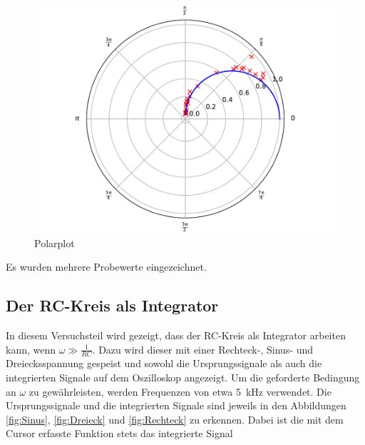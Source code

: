 \begin{figure}
  \centering
  \includegraphics[scale=0.8]{content/plot4.pdf}
  \caption{Polarplot}
  \label{fig:plot4}
\end{figure}

Es wurden mehrere Probewerte eingezeichnet.

\subsection{Der RC-Kreis als Integrator}

In diesem Versuchsteil wird gezeigt, dass der RC-Kreis als Integrator arbeiten 
kann, wenn $\omega \gg \frac{1}{RC}$. Dazu wird dieser mit einer Rechteck-, 
Sinus- und Dreiecksspannung gespeist und sowohl die Ursprungssignale als auch 
die integrierten Signale auf dem Oszilloskop angezeigt. Um die geforderte 
Bedingung an $\omega$ zu gewährleisten, werden Frequenzen von etwa \SI{5}{\kilo\hertz}
verwendet. 
Die Ursprungssignale und die integrierten Signale sind jeweils in den Abbildungen 
\ref{fig:Sinus}, \ref{fig:Dreieck} und \ref{fig:Rechteck} zu erkennen. Dabei ist
die mit dem Cursor erfasste Funktion stets das integrierte Signal

